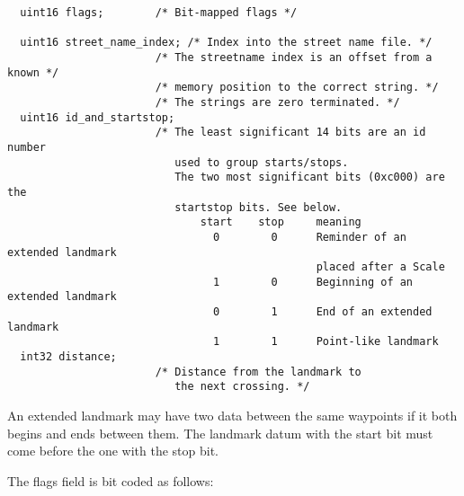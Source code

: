 \documentclass[a4paper]{article}
\begin{document}
\begin{verbatim}
  uint16 flags;        /* Bit-mapped flags */

  uint16 street_name_index; /* Index into the street name file. */
                       /* The streetname index is an offset from a known */
                       /* memory position to the correct string. */
                       /* The strings are zero terminated. */
  uint16 id_and_startstop;
                       /* The least significant 14 bits are an id number
                          used to group starts/stops. 
                          The two most significant bits (0xc000) are the 
                          startstop bits. See below.
                              start    stop     meaning
                                0        0      Reminder of an extended landmark 
                                                placed after a Scale
                                1        0      Beginning of an extended landmark
                                0        1      End of an extended landmark
                                1        1      Point-like landmark
  int32 distance;
                       /* Distance from the landmark to 
                          the next crossing. */
\end{verbatim}

An extended landmark may have two data between the same 
waypoints if it both begins and ends between them. The
landmark datum with the start bit must come before the
one with the stop bit.

The flags field is bit coded as follows:
\end{document}
